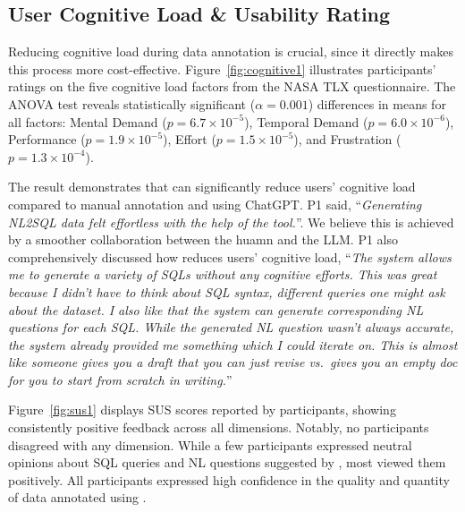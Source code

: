 \subsection{User Cognitive Load \& Usability Rating}


Reducing cognitive load during data annotation is crucial, since it directly makes this process more cost-effective. Figure~\ref{fig:cognitive1} illustrates participants' ratings on the five cognitive load factors from the NASA TLX questionnaire. The ANOVA test reveals statistically significant ($\alpha = 0.001$) differences in means for all factors: Mental Demand ($p = 6.7 \times 10^{-5}$), Temporal Demand ($p = 6.0 \times 10^{-6}$), Performance ($p = 1.9 \times 10^{-5}$), Effort ($p = 1.5 \times 10^{-5}$), and Frustration ($p = 1.3 \times 10^{-4}$).



The result demonstrates that {\tool} can significantly reduce users' cognitive load compared to manual annotation and using ChatGPT.
P1 said, ``\textit{Generating NL2SQL data felt effortless with the help of the tool.}''.
We believe this is achieved by a smoother collaboration between the huamn and the LLM.
P1 also comprehensively discussed how {\tool} reduces users' cognitive load,
``\textit{The system allows me to generate a variety of SQLs without any cognitive efforts. This was great because I didn't have to think about SQL syntax, different queries one might ask about the dataset. I also like that the system can generate corresponding NL questions for each SQL. While the generated NL question wasn't always accurate, the system already provided me something which I could iterate on. This is almost like someone gives you a draft that you can just revise vs.~gives you an empty doc for you to start from scratch in writing.}''






Figure~\ref{fig:sus1} displays SUS scores reported by participants, showing consistently positive feedback across all dimensions. Notably, no participants disagreed with any dimension. While a few participants expressed neutral opinions about SQL queries and NL questions suggested by {\tool}, most viewed them positively. All participants expressed high confidence in the quality and quantity of data annotated using {\tool}.